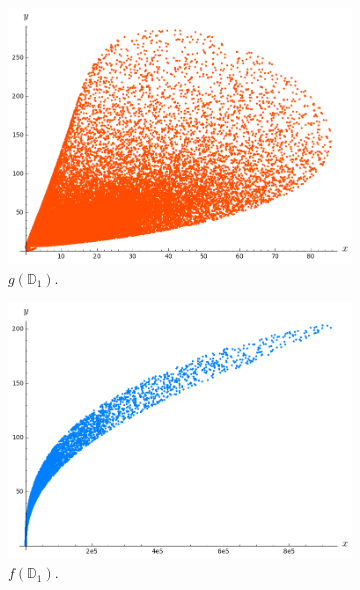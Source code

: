 \documentclass{beamer}
\begin{document}
\begin{frame}
\begin{figure}
\vspace{-0.25cm}
\begin{subfigure}{.32\linewidth}\centering
\includegraphics[width=1\textwidth]{plots/ch5_35_disc1.png}
\caption{$g({\mathbb D}_1)$.}
\end{subfigure}
\begin{subfigure}{.32\linewidth}\centering
\includegraphics[width=1\textwidth]{plots/ch5_37_disc2.png}
\caption{$f({\mathbb D}_1)$.}
\end{subfigure}
\begin{subfigure}{.32\linewidth}\centering

\end{subfigure}
\end{figure}
\end{frame}
\end{document}
